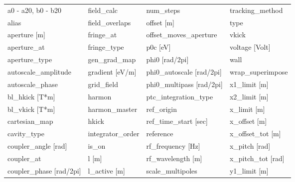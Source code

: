  \begin{tabular}{llll} \toprule
a0 - a20, b0 - b20               & field_calc                       & num_steps                        & tracking_method                  \\
alias                            & field_overlaps                   & offset [m]                       & type                             \\
aperture [m]                     & fringe_at                        & offset_moves_aperture            & vkick                            \\
aperture_at                      & fringe_type                      & p0c [eV]                         & voltage [Volt]                   \\
aperture_type                    & gen_grad_map                     & phi0 [rad/2pi]                   & wall                             \\
autoscale_amplitude              & gradient [eV/m]                  & phi0_autoscale [rad/2pi]         & wrap_superimpose                 \\
autoscale_phase                  & grid_field                       & phi0_multipass [rad/2pi]         & x1_limit [m]                     \\
bl_hkick [T*m]                   & harmon                           & ptc_integration_type             & x2_limit [m]                     \\
bl_vkick [T*m]                   & harmon_master                    & ref_origin                       & x_limit [m]                      \\
cartesian_map                    & hkick                            & ref_time_start [sec]             & x_offset [m]                     \\
cavity_type                      & integrator_order                 & reference                        & x_offset_tot [m]                 \\
coupler_angle [rad]              & is_on                            & rf_frequency [Hz]                & x_pitch [rad]                    \\
coupler_at                       & l [m]                            & rf_wavelength [m]                & x_pitch_tot [rad]                \\
coupler_phase [rad/2pi]          & l_active [m]                     & scale_multipoles                 & y1_limit [m]                     \\

\end{tabular}
